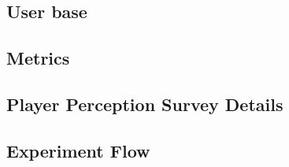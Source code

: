 
\subsection{User base}





\subsection{Metrics}



\subsection{Player Perception Survey Details}

\subsection{Experiment Flow}


